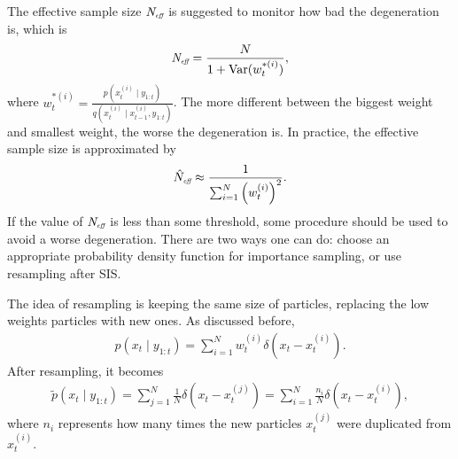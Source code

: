 The effective sample size $\textit{N}_{\textit{\tiny eff}}$ is suggested to monitor how bad the degeneration is, which is
\begin{align*}
\textit{N}_{\textit{\tiny eff}}=\frac{N}{1+\mathrm{Var}(w_t^{*(i)})},
\end{align*}
where $w_t^{*(i)}=\frac{p(x_t^{(i)}\mid y_{1:t})}{q(x_t^{(i)}\mid x_{t-1}^{(i)},y_{1:t})}$. The more different between the biggest weight and smallest weight, the worse the degeneration is. In practice, the effective sample size is approximated by
\begin{align*}
\hat{N}_{\textit{\tiny eff}}\approx \frac{1}{\sum_{i=1}^{N}\left(w_t^{(i)}\right)^2}.
\end{align*}
If the value of $\textit{N}_{\textit{\tiny eff}}$ is less than some threshold, some procedure should be used to avoid a worse degeneration. There are two ways one can do: choose an appropriate probability density function for importance sampling, or use resampling after SIS. 

The idea of resampling is keeping the same size of particles, replacing the low weights particles with new ones. As discussed before, 
\begin{align*}
p(x_t \mid y_{1:t})=\sum_{i=1}^Nw_t^{(i)} \delta \left(x_t -x_t^{(i)}\right).
\end{align*}
After resampling, it becomes
\begin{align*}
\tilde{p}(x_t \mid y_{1:t})=\sum_{j=1}^N\frac{1}{N} \delta \left(x_t -x_t^{(j)}\right)= \sum_{i=1}^N\frac{n_i}{N} \delta \left(x_t -x_t^{(i)}\right),
\end{align*}
where $n_i$ represents how many times the new particles $x_t^{(j)}$ were duplicated from$x_t^{(i)}$. 

